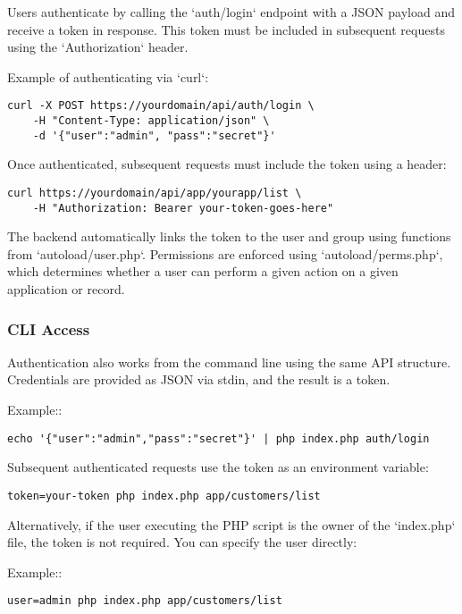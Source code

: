 \documentclass[a4paper]{article}
\begin{document}
Users authenticate by calling the `auth/login` endpoint with a JSON payload and receive a token in response. This token must be included in subsequent requests using the `Authorization` header.

Example of authenticating via `curl`:

\begin{lstlisting}
curl -X POST https://yourdomain/api/auth/login \
    -H "Content-Type: application/json" \
    -d '{"user":"admin", "pass":"secret"}'
\end{lstlisting}

Once authenticated, subsequent requests must include the token using a header:

\begin{lstlisting}
curl https://yourdomain/api/app/yourapp/list \
    -H "Authorization: Bearer your-token-goes-here"
\end{lstlisting}

The backend automatically links the token to the user and group using functions from `autoload/user.php`. Permissions are enforced using `autoload/perms.php`, which determines whether a user can perform a given action on a given application or record.

\hypertarget{toc25}{}
\subsubsection{CLI Access}

Authentication also works from the command line using the same API structure. Credentials are provided as JSON via stdin, and the result is a token.

Example::

\begin{lstlisting}
echo '{"user":"admin","pass":"secret"}' | php index.php auth/login
\end{lstlisting}

Subsequent authenticated requests use the token as an environment variable:

\begin{lstlisting}
token=your-token php index.php app/customers/list
\end{lstlisting}

Alternatively, if the user executing the PHP script is the owner of the `index.php` file, the token is not required. You can specify the user directly:

Example::

\begin{lstlisting}
user=admin php index.php app/customers/list
\end{lstlisting}
\end{document}
